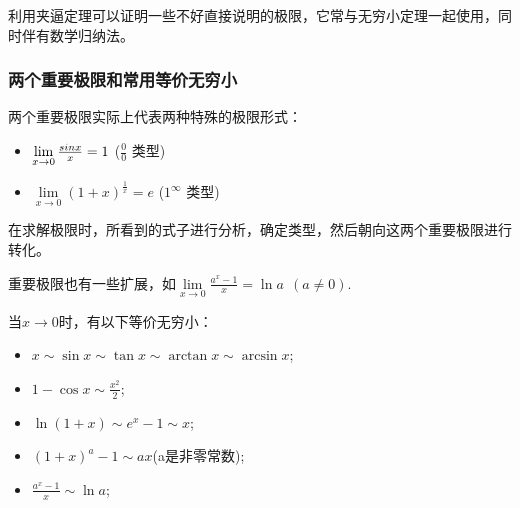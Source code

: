 \documentclass[12pt , a4paper , oneside]{ctexart}
\begin{document}
            利用夹逼定理可以证明一些不好直接说明的极限，它常与无穷小定理一起使用，同时伴有数学归纳法。

            \subsubsection{两个重要极限和常用等价无穷小}

            两个重要极限实际上代表两种特殊的极限形式：
            \begin{itemize}
                \item $\lim\limits_{x \to 0} \frac{\\sin  x}{x} = 1$ ($\frac{0}{0}$ 类型)
                \item $\lim\limits_{x \to 0} (1+x)^\frac{1}{x} = e$ ($1^\infty$ 类型)
            \end{itemize}

            在求解极限时，所看到的式子进行分析，确定类型，然后朝向这两个重要极限进行转化。

            重要极限也有一些扩展，如$\lim\limits_{x \to 0} \frac{a^x-1}{x} = \ln a~~(a \neq 0)$.

            当$x \to 0$时，有以下等价无穷小：
            \begin{itemize}
                
            \item  $x \sim \sin  x \sim \tan x \sim \arctan x \sim \arcsin  x$;
            
            \item  $1-\cos  x \sim \frac{x^2}{2}$;

            \item  $\ln(1+x) \sim e^x - 1 \sim x$;

            \item  $(1+x)^a -1 \sim ax$(a是非零常数);

            \item  $\frac{a^x-1}{x} \sim \ln a$;
            \end{itemize}
\end{document}
